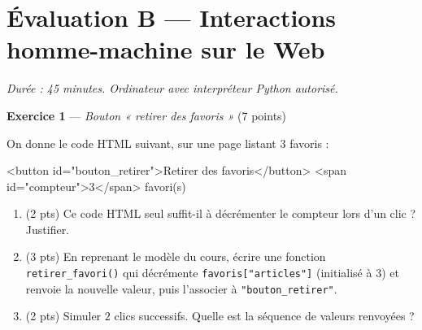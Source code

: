 \section*{Évaluation B --- Interactions homme-machine sur le Web}
\textit{Durée : 45 minutes. Ordinateur avec interpréteur Python autorisé.}


\bigskip

\textbf{Exercice 1} --- \textit{Bouton « retirer des favoris »} \hfill (7 points)

On donne le code HTML suivant, sur une page listant $3$ favoris :
\begin{console}
<button id="bouton_retirer">Retirer des favoris</button>
<span id="compteur">3</span> favori(s)
\end{console}

\begin{enumerate}
  \item (2 pts) Ce code HTML seul suffit-il à décrémenter le compteur lors d'un clic ? Justifier.
  \item (3 pts) En reprenant le modèle du cours, écrire une fonction \lstinline{retirer_favori()} qui décrémente \lstinline{favoris["articles"]} (initialisé à $3$) et renvoie la nouvelle valeur, puis l'associer à \lstinline{"bouton_retirer"}.
  \item (2 pts) Simuler $2$ clics successifs. Quelle est la séquence de valeurs renvoyées ?
\end{enumerate}


